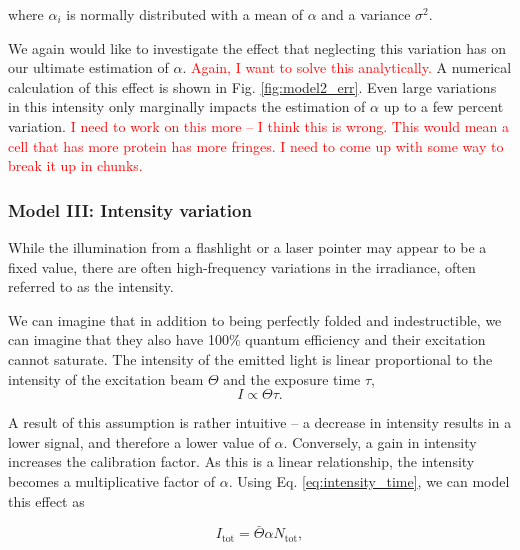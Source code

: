 where $\alpha_i$ is normally distributed with a mean of $\alpha$ and a variance $\sigma^2$.

We again would like to investigate the effect that neglecting this variation has on our ultimate
estimation of $\alpha$.
\textcolor{red}{Again, I want to solve this analytically.} A numerical calculation of this effect
is shown in Fig. \ref{fig:model2_err}. Even large variations in this intensity only marginally
impacts the estimation of $\alpha$ up to a few percent variation. \textcolor{red}{I need to work
on this more -- I think this is wrong. This would mean a cell that has more protein has more
fringes. I need to come up with some way to break it up in chunks.}

\begin{figure}
\end{figure}


\subsubsection*{Model III: Intensity variation}
While the illumination from a flashlight or a laser pointer may appear to be a fixed value, there
are often high-frequency variations in the irradiance, often referred to as the intensity.

We can imagine that in addition to being perfectly folded and indestructible, we can imagine that
they also have 100\% quantum efficiency and their excitation cannot saturate. The intensity of the
emitted light is linear proportional to the intensity of the excitation beam $\Theta$ and the
exposure time $\tau$,
\begin{equation}
  I \propto \Theta \tau.
  \label{eq:intensity_time}
\end{equation}

A result of this assumption is rather intuitive -- a decrease in intensity results in a lower signal,
and therefore a lower value of $\alpha$. Conversely, a gain in intensity increases the calibration
factor. As this is a linear relationship, the intensity becomes a multiplicative factor of $\alpha$.
Using Eq. \ref{eq:intensity_time}, we can model this effect as

\begin{equation}
  I_\text{tot} = \bar{\Theta}\alpha N_\text{tot},
\end{equation}

